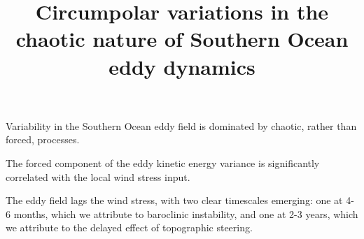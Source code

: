 \documentclass[linenumbers]{agujournal2019}
\begin{document}
\justify
\title{Circumpolar variations in the chaotic nature of Southern Ocean eddy dynamics}




\begin{keypoints}
\item Variability in the Southern Ocean eddy field is dominated by chaotic, rather than forced, processes.
\item The forced component of the eddy kinetic energy variance is significantly correlated with the local wind stress input.
\item The eddy field lags the wind stress, with two clear timescales emerging: one at 4-6 months, which we attribute to baroclinic instability, and one at 2-3 years, which we attribute to the delayed effect of topographic steering.
\end{keypoints}
\end{document}
